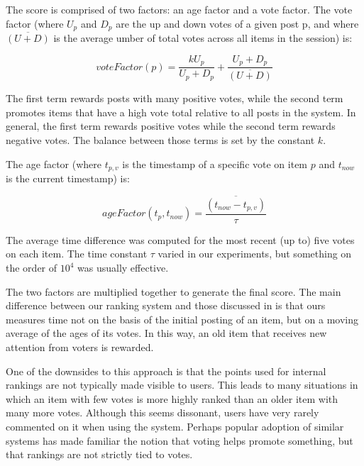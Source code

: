 The score is comprised of two factors: an age factor and a vote factor. The vote factor (where $U_p$ and $D_p$ are the up and down votes of a given post p, and where $\overline{(U+D)}$ is the average umber of total votes across all items in the session) is:

\begin{equation}
voteFactor(p) = \frac{kU_p}{U_p + D_p} + \frac{U_p + D_p}{\overline{(U+D)}}
\end{equation}

The first term rewards posts with many positive votes, while the second term promotes items that have a high vote total relative to all posts in the system. In general, the first term rewards positive votes while the second term rewards negative votes. The balance between those terms is set by the constant $k$. 

The age factor (where $t_{p,v}$ is the timestamp of a specific vote on item $p$ and $t_{now}$ is the current timestamp) is:

\begin{equation}
ageFactor(t_p, t_{now}) = \frac{\overline{(t_{now} - t_{p,v})}}{\tau}
\end{equation}

The average time difference was computed for the most recent (up to) five votes on each item. The time constant $\tau$ varied in our experiments, but something on the order of $10^4$ was usually effective.

The two factors are multiplied together to generate the final score.
The main difference between our ranking system and those discussed in \citep{Anonymous:8tu} is that ours measures time not on the basis of the initial posting of an item, but on a moving average of the ages of its votes. In this way, an old item that receives new attention from voters is rewarded.

One of the downsides to this approach is that the points used for internal rankings are not typically made visible to users. This leads to many situations in which an item with few votes is more highly ranked than an older item with many more votes. Although this seems dissonant, users have very rarely commented on it when using the system. Perhaps popular adoption of similar systems has made familiar the notion that voting helps promote something, but that rankings are not strictly tied to votes.

